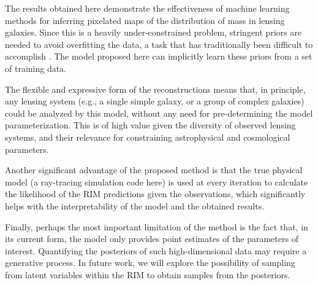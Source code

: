
The results obtained here demonstrate the effectiveness of machine learning methods for inferring pixelated maps of the distribution of mass in lensing galaxies. Since this is a heavily under-constrained problem, stringent priors are needed to avoid overfitting the data, a task that has traditionally been difficult to accomplish \citep[e.g., ][]{Saha1997}. The model proposed here can implicitly learn these priors from a set of training data. 

The flexible and expressive form of the reconstructions means that, in principle, any lensing system (e.g., a single simple galaxy, or a group of complex galaxies) could be analyzed by this model, without any need for pre-determining the model parameterization. This is of high value given the diversity of observed lensing systems, and their relevance for constraining astrophysical and cosmological parameters. 

Another significant advantage of the proposed method is that the true physical model (a ray-tracing simulation code here) is used at every iteration to calculate the likelihood of the RIM predictions given the observations, which significantly helps with the interpretability of the model and the obtained results. 

Finally, perhaps the most important limitation of the method is the fact that, in its current form, the model only provides point estimates of the parameters of interest. Quantifying the posteriors of such high-dimensional data may require a generative process. In future work, we will explore the possibility of sampling from latent variables within the RIM to obtain samples from the posteriors.  

